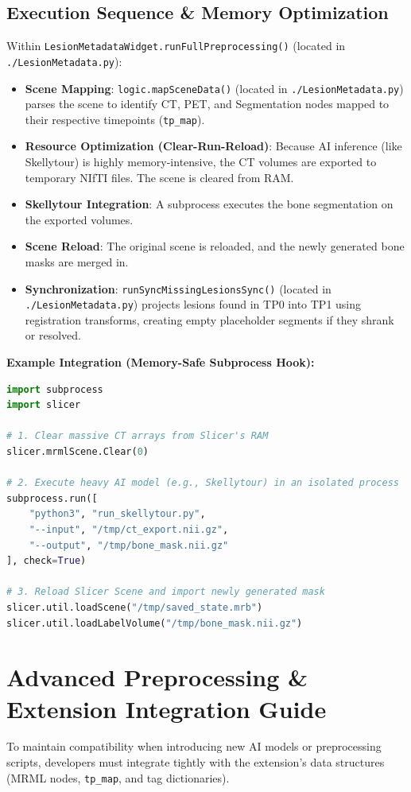 \documentclass[a4paper,10pt]{article}
\begin{document}
\subsection{Execution Sequence \& Memory Optimization}
Within \texttt{LesionMetadataWidget.runFullPreprocessing()} (located in \texttt{./LesionMetadata.py}):
\begin{itemize}
    \item \textbf{Scene Mapping}: \texttt{logic.mapSceneData()} (located in \texttt{./LesionMetadata.py}) parses the scene to identify CT, PET, and Segmentation nodes mapped to their respective timepoints (\texttt{tp\_map}).
    \item \textbf{Resource Optimization (Clear-Run-Reload)}: Because AI inference (like Skellytour) is highly memory-intensive, the CT volumes are exported to temporary NIfTI files. The scene is cleared from RAM.
    \item \textbf{Skellytour Integration}: A subprocess executes the bone segmentation on the exported volumes.
    \item \textbf{Scene Reload}: The original scene is reloaded, and the newly generated bone masks are merged in.
    \item \textbf{Synchronization}: \texttt{runSyncMissingLesionsSync()} (located in \texttt{./LesionMetadata.py}) projects lesions found in TP0 into TP1 using registration transforms, creating empty placeholder segments if they shrank or resolved.
\end{itemize}

\textbf{Example Integration (Memory-Safe Subprocess Hook):}
\begin{lstlisting}[language=Python]
import subprocess
import slicer

# 1. Clear massive CT arrays from Slicer's RAM
slicer.mrmlScene.Clear(0)

# 2. Execute heavy AI model (e.g., Skellytour) in an isolated process
subprocess.run([
    "python3", "run_skellytour.py", 
    "--input", "/tmp/ct_export.nii.gz",
    "--output", "/tmp/bone_mask.nii.gz"
], check=True)

# 3. Reload Slicer Scene and import newly generated mask
slicer.util.loadScene("/tmp/saved_state.mrb")
slicer.util.loadLabelVolume("/tmp/bone_mask.nii.gz")
\end{lstlisting}

\section{Advanced Preprocessing \& Extension Integration Guide}
To maintain compatibility when introducing new AI models or preprocessing scripts, developers must integrate tightly with the extension's data structures (MRML nodes, \texttt{tp\_map}, and tag dictionaries).
\end{document}
